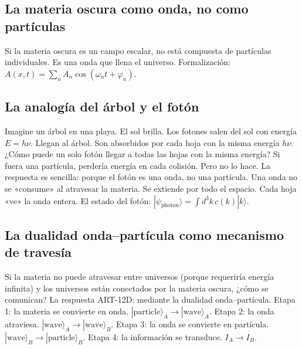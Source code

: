 \documentclass[11pt,a4paper]{article}
\begin{document}
\subsection{La materia oscura como onda, no como partículas}
Si la materia oscura es un campo escalar, no está compuesta de partículas individuales. Es una onda que llena el universo. Formalización: $A(x,t) = \sum_n A_n \cos(\omega_n t + \varphi_n)$.

\subsection{La analogía del árbol y el fotón}
Imagine un árbol en una playa. El sol brilla. Los fotones salen del sol con energía $E = h\nu$. Llegan al árbol. Son absorbidos por cada hoja con la misma energía $h\nu$. ¿Cómo puede un solo fotón llegar a todas las hojas con la misma energía? Si fuera una partícula, perdería energía en cada colisión. Pero no lo hace. La respuesta es sencilla: porque el fotón es una onda, no una partícula. Una onda no se «consume» al atravesar la materia. Se extiende por todo el espacio. Cada hoja «ve» la onda entera. El estado del fotón: $|\psi_{\text{photon}}\rangle = \int d^3k \, c(k) |k\rangle$.

\subsection{La dualidad onda--partícula como mecanismo de travesía}
Si la materia no puede atravesar entre universos (porque requeriría energía infinita) y los universos están conectados por la materia oscura, ¿cómo se comunican? La respuesta ART-12D: mediante la dualidad onda--partícula. Etapa 1: la materia se convierte en onda. $|\text{particle}\rangle_A \to |\text{wave}\rangle_A$. Etapa 2: la onda atraviesa. $|\text{wave}\rangle_A \to |\text{wave}\rangle_B$. Etapa 3: la onda se convierte en partícula. $|\text{wave}\rangle_B \to |\text{particle}\rangle_B$. Etapa 4: la información se transduce. $I_A \to I_B$.
\end{document}
